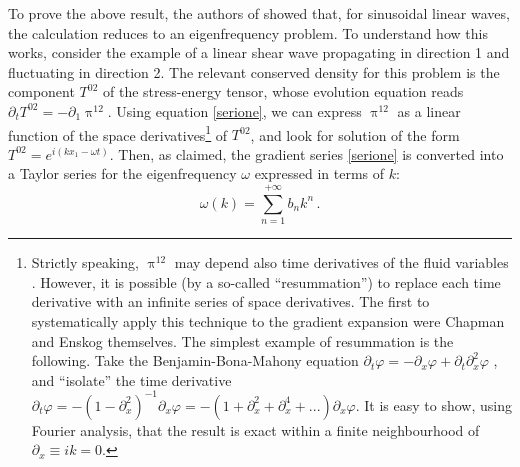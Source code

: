 \documentclass[a4paper, amsfonts, amssymb, amsmath, reprint, showkeys, nofootinbib, twoside, onecolumn,notitlepage]{revtex4-2}
\theoremstyle{definition}
\theoremstyle{theorem}
\theoremstyle{corollary}
\begin{document}
To prove the above result, the authors of \cite{GrozdanovGradient2019kge,McLennan1965,Dudynski1989} showed that, for sinusoidal linear waves, the calculation reduces to an eigenfrequency problem. To understand how this works, consider the example of a linear shear wave propagating in direction 1 and fluctuating in direction 2. The relevant conserved density for this problem is the component $T^{02}$ of the stress-energy tensor, whose evolution equation reads $\partial_t T^{02}=-\partial_1 \uppi^{12}$. Using equation \eqref{serione}, we can express $\uppi^{12}$ as a linear function of the space derivatives\footnote{Strictly speaking, $\uppi^{12}$ may depend also time derivatives of the fluid variables \cite{GavassinoInfiniteOrder2024pgl}. However, it is possible (by a so-called ``resummation'') to replace each time derivative with an infinite series of space derivatives. The first to systematically apply this technique to the gradient expansion were Chapman and Enskog themselves. The simplest example of resummation is the following. Take the Benjamin-Bona-Mahony equation $\partial_t \varphi=-\partial_x \varphi +\partial_t \partial^2_x \varphi$ \cite{Benjamin1972,GavassinoDispersions2024}, and ``isolate'' the time derivative $\partial_t \varphi=-(1{-}\partial^2_x)^{-1}\partial_x \varphi=-(1{+}\partial^2_x{+}\partial^4_x{+}...)\partial_x \varphi$. It is easy to show, using Fourier analysis, that the result is exact within a finite neighbourhood of $\partial_x \equiv ik=0$.} of $T^{02}$, and look for solution of the form $T^{02}=e^{i(kx_1-\omega t)}$. Then, as claimed, the gradient series \eqref{serione} is converted into a Taylor series for the  eigenfrequency $\omega$ expressed in terms of $k$:
\begin{equation}\label{dispersionwk}
\omega(k)=\sum_{n=1}^{+\infty} b_{n} k^n \, .
\end{equation}
\end{document}
